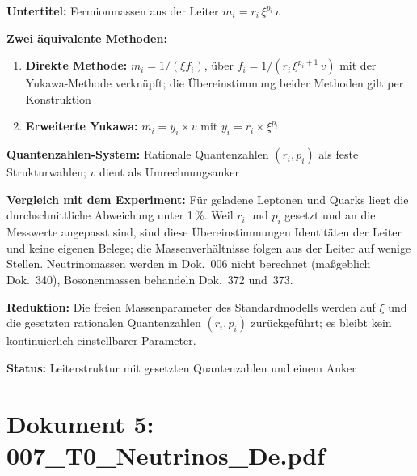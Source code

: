 	\begin{documentbox}
		\textbf{Untertitel:} Fermionmassen aus der Leiter $m_i = r_i\,\xi^{p_i}\,v$
		
		\textbf{Zwei äquivalente Methoden:}
		\begin{enumerate}
			\item \textbf{Direkte Methode:} $m_i = 1/(\xi f_i)$, über $f_i = 1/(r_i\,\xi^{p_i+1}\,v)$ mit der Yukawa-Methode verknüpft; die Übereinstimmung beider Methoden gilt per Konstruktion
			\item \textbf{Erweiterte Yukawa:} $m_i = y_i \times v$ mit $y_i = r_i \times \xi^{p_i}$
		\end{enumerate}
		
		\textbf{Quantenzahlen-System:} Rationale Quantenzahlen $(r_i, p_i)$ als feste Strukturwahlen; $v$ dient als Umrechnungsanker
		
		\textbf{Vergleich mit dem Experiment:} Für geladene Leptonen und Quarks liegt die durchschnittliche Abweichung unter 1\,\%. Weil $r_i$ und $p_i$ gesetzt und an die Messwerte angepasst sind, sind diese Übereinstimmungen Identitäten der Leiter und keine eigenen Belege; die Massenverhältnisse folgen aus der Leiter auf wenige Stellen. Neutrinomassen werden in Dok.~006 nicht berechnet (maßgeblich Dok.~340), Bosonenmassen behandeln Dok.~372 und~373.
		
		\textbf{Reduktion:} Die freien Massenparameter des Standardmodells werden auf $\xi$ und die gesetzten rationalen Quantenzahlen $(r_i, p_i)$ zurückgeführt; es bleibt kein kontinuierlich einstellbarer Parameter.
		
		\textbf{Status:} Leiterstruktur mit gesetzten Quantenzahlen und einem Anker
	\end{documentbox}
	
	\section{Dokument 5: 007\_T0\_Neutrinos\_De.pdf}
	
